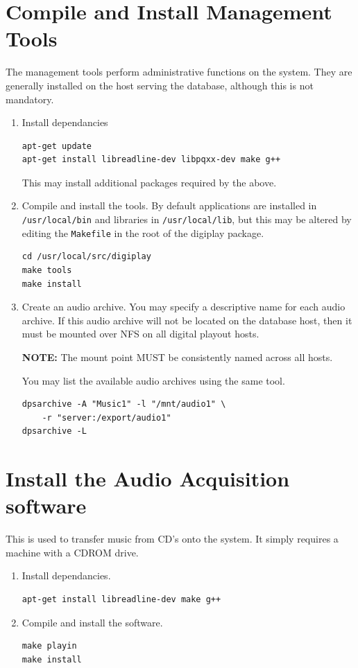 \documentclass[a4paper,12pt]{report}
\numberwithin{equation}{section}
\begin{document}
\section{Compile and Install Management Tools}
The management tools perform administrative functions on the system. They are generally installed on the host serving the database, although this is not mandatory.
\begin{enumerate}
\item Install dependancies
\begin{lstlisting}
apt-get update
apt-get install libreadline-dev libpqxx-dev	make g++
\end{lstlisting}
This may install additional packages required by the above.
\item Compile and install the tools. By default applications are installed in \texttt{/usr/local/bin} and libraries in \texttt{/usr/local/lib}, but this may be altered by editing the \texttt{Makefile} in the root of the digiplay package.
\begin{lstlisting}
cd /usr/local/src/digiplay
make tools
make install
\end{lstlisting}
\item Create an audio archive. You may specify a descriptive name for each audio archive. If this audio archive will not be located on the database host, then it must be mounted over NFS on all digital playout hosts.\par
\textbf{NOTE:} The mount point MUST be consistently named across all hosts.\par
You may list the available audio archives using the same tool.
\begin{lstlisting}
dpsarchive -A "Music1" -l "/mnt/audio1" \
	-r "server:/export/audio1"
dpsarchive -L
\end{lstlisting}
\end{enumerate}

\section{Install the Audio Acquisition software}
This is used to transfer music from CD's onto the system. It simply requires a machine with a CDROM drive.
\begin{enumerate}
\item Install dependancies.
\begin{lstlisting}
apt-get install libreadline-dev make g++
\end{lstlisting}
\item Compile and install the software.
\begin{lstlisting}
make playin
make install
\end{lstlisting}
\end{enumerate}
\end{document}
